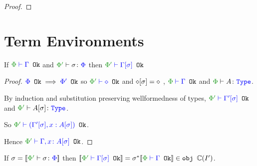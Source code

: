 \documentclass{report}
\begin{document}
\begin{framed}
\begin{proof}
    \end{proof}
\end{framed}

\section{Term Environments}

\begin{theorem}
    If $\wellformedok{\P}{\G}$ and $\typerelation{\P'}{\si}{\P}$ then $\wellformedok{\P'}{\G\ssi}$
    
\end{theorem}

\begin{framed}   
    \begin{proof}
        \case{\envnil}
        ${\color{blue} \Phi} \texttt{ Ok}\implies{\color{blue} \Phi'} \texttt{ Ok}$ so $\wellformedok{\P'}{\nil}$
        and $\diamond[\sigma] = \diamond$
        \case{\envextend}
        \bi, $\wellformedok{\P}{\G}$ and $\wellformedt{\P}{A}$.
        
        By induction and substitution preserving wellformedness of types, $\wellformedok{\P'}{\G'\ssi}$ and $\wellformedt{\P'}{A\ssi}$.
        
        
        So $\wellformedok{\P'}{(\G'\ssi, x: A\ssi)}$.
        
        Hence $\wellformedok{\P'}{\gax\ssi}$.
    \end{proof}
    
\end{framed}


\begin{theorem}
    If $\si = \deno{\typerelation{\P'}{\si}{\P}}$ then $\deno{\wellformedok{\P'}{\G\ssi}} = \si\star\deno{\wellformedok{\P}{\G}}\in\obj\C(I')$.
\end{theorem}
\end{document}

